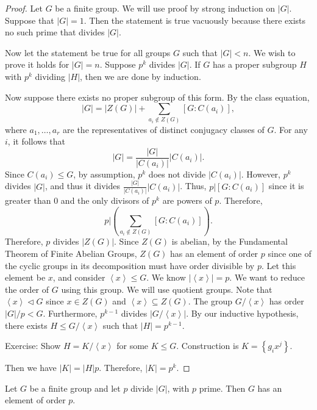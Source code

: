 \begin{proof}
	Let $G$ be a finite group. We will use proof by strong induction on $\left| G \right| $. Suppose that $\left| G \right| =1$. Then the statement is true vacuously because there exists no such prime that divides $\left| G \right| $.

	Now let the statement be true for all groups $G$ such that $\left| G \right| <n$. We wish to prove it holds for $\left| G \right| =n$. Suppose $p^k$ divides $\left| G \right| $. If $G$ has a proper subgroup $H$ with $p^k$ dividing $\left| H \right| $, then we are done by induction.

	Now suppose there exists no proper subgroup of this form. By the class equation,
	\[
		\left| G \right| =\left| Z(G) \right| +\sum_{a_i\notin Z(G)} \left[ G : C(a_i) \right] 
	,\]
	where $a_1, \ldots, a_r$ are the representatives of distinct conjugacy classes of $G$. For any $i$, it follows that
	\[
		\left| G \right| =\frac{\left| G \right| }{\left| C(a_i) \right| }\left| C(a_i) \right| 
	.\]
	Since $C(a_i)\leq G$, by assumption, $p^k$ does not divide $\left| C(a_i) \right| $. However, $p^k$ divides $\left| G \right| $, and thus it divides $\frac{\left| G \right| }{\left| C(a_i) \right| }\left| C(a_i) \right| $. Thus, $p|\left[ G : C(a_i) \right] $ since it is greater than $0$ and the only divisors of $p^k$ are powers of $p$. Therefore,
	\[
		p|\left( \sum_{a_i\notin Z(G)} \left[ G: C(a_i) \right]  \right) 
	.\]
	Therefore, $p$ divides $\left| Z(G) \right| $. Since $Z(G)$ is abelian, by the Fundamental Theorem of Finite Abelian Groups, $Z(G)$ has an element of order $p$ since one of the cyclic groups in its decomposition must have order divisible by $p$. Let this element be $x$, and consider $\left<x \right> \leq G$. We know $\left| \left<x \right> \right| =p$. We want to reduce the order of $G$ using this group. We will use quotient groups. Note that $\left<x \right>\triangleleft G$ since $x\in Z(G)$ and $\left<x \right>\subseteq Z(G)$. The group $G / \left<x \right>$ has order $\left| G \right| /p<G$. Furthermore, $p ^{k-1}$ divides $\left| G / \left<x \right>  \right| $. By our inductive hypothesis, there exists $H\leq G / \left<x \right>$ such that $\left| H \right| =p ^{k-1}$.

	Exercise: Show $H = K / \left<x \right>$ for some $K\leq G$. Construction is $K=\left\{ g_ix^j \right\} $.

	Then we have $\left| K \right| =\left| H \right| p$. Therefore, $\left| K \right| =p^k$.
\end{proof}
\begin{corollary}
	Let $G$ be a finite group and let $p$ divide $\left| G \right| $, with $p$ prime. Then $G$ has an element of order $p$.
\end{corollary}
